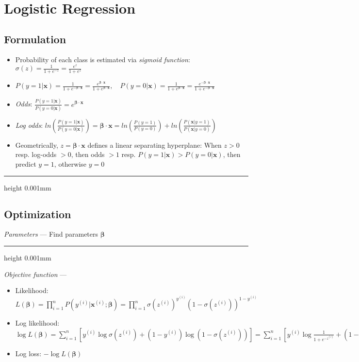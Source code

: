 \section{Logistic Regression}
\subsection*{Formulation}
\begin{itemize}
    \item Probability of each class is estimated via \emph{sigmoid function}: $\sigma(z) = \frac{1}{1+e^{-z}} = \frac{e^{z}}{1+e^{z}}$
    \item $P(y=1|\boldsymbol{x}) = \frac{1}{1+e^{-\boldsymbol{\beta} \cdot \boldsymbol{x}}} = \frac{e^{\boldsymbol{\beta} \cdot \boldsymbol{x}}}{1+e^{\boldsymbol{\beta} \cdot \boldsymbol{x}}}, \quad P(y=0|\boldsymbol{x}) = \frac{1}{1+e^{\boldsymbol{\beta} \cdot \boldsymbol{x}}} = \frac{e^{-\boldsymbol{\beta} \cdot \boldsymbol{x}}}{1+e^{-\boldsymbol{\beta} \cdot \boldsymbol{x}}}$
    \item \emph{Odds}: $\frac{P(y=1|\boldsymbol{x})}{P(y=0|\boldsymbol{x})} = e^{\boldsymbol{\beta} \cdot \boldsymbol{x}}$
    \item \emph{Log odds}: $ln(\frac{P(y=1|\boldsymbol{x})}{P(y=0|\boldsymbol{x})}) = \boldsymbol{\beta} \cdot \boldsymbol{x} = ln(\frac{P(y=1)}{P(y=0)}) + ln(\frac{P(\boldsymbol{x}|y=1)}{P(\boldsymbol{x}|y=0)})$
    \item Geometrically, $z = \boldsymbol{\beta} \cdot \boldsymbol{x}$ defines a linear separating hyperplane: When $z > 0$ resp. log-odds $> 0$, then odds $> 1$ resp. $P(y=1|\boldsymbol{x}) > P(y=0|\boldsymbol{x})$, then predict $y = 1$, otherwise $y = 0$
\end{itemize}

{\color{black}\hrule height 0.001mm}

\subsection*{Optimization}
\emph{Parameters} --- Find parameters $\boldsymbol{\beta}$

{\color{lightgray}\hrule height 0.001mm}

\emph{Objective function} --- 
\begin{itemize}
    \item Likelihood: $L(\boldsymbol{\beta}) = \prod_{i=1}^n P(y^{(i)} | \boldsymbol{x}^{(i)}; \boldsymbol{\beta}) = \prod_{i=1}^n \sigma(z^{(i)})^{y^{(i)}} (1 - \sigma(z^{(i)}))^{1 - y^{(i)}}$
    \item Log likelihood: 
    $\log L(\boldsymbol{\beta}) = \sum_{i=1}^n \left[ y^{(i)} \log \sigma(z^{(i)}) + (1 - y^{(i)}) \log (1 - \sigma(z^{(i)})) \right] = \sum_{i=1}^n \left[ y^{(i)} \log \frac{1}{1 + e^{-z^{(i)}}} + (1 - y^{(i)}) \log \frac{e^{-z^{(i)}}}{1 + e^{-z^{(i)}}} \right] = \sum_{i=1}^n \left[ y^{(i)} z^{(i)} - \log (1 + e^{z^{(i)}}) \right]$
    \item Log loss: $ -\log L(\boldsymbol{\beta})$
\end{itemize}

